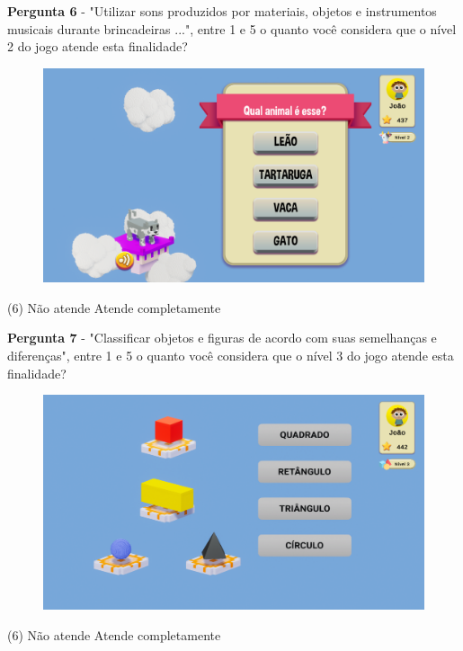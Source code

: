 \documentclass[article,12pt,openany,oneside,a4paper,english,brazil]{abntex2}
\begin{document}
\textbf{Pergunta 6} - "Utilizar sons produzidos por materiais, objetos e instrumentos musicais durante brincadeiras ...", entre 1 e 5 o quanto você considera que o nível 2 do jogo atende esta finalidade?

\begin{figure}[H]
    \centering
    \label{fig:aluno_pergunta_5}
    \includegraphics[width=0.8\linewidth]{GameScreenshots/Level2.png}
\end{figure}

\normalfont
\begin{tasks}[style=enumerate, item-format={\normalfont\tiny}, after-item-skip=4mm](6)
\task Não atende
\task 
\task 
\task 
\task Atende completamente
\end{tasks}

\textbf{Pergunta 7} - "Classificar objetos e figuras de acordo com suas semelhanças e diferenças", entre 1 e 5 o quanto você considera que o nível 3 do jogo atende esta finalidade?

\begin{figure}[H]
    \centering
    \label{fig:aluno_pergunta_5}
    \includegraphics[width=0.8\linewidth]{GameScreenshots/Level3.png}
\end{figure}

\normalfont
\begin{tasks}[style=enumerate, item-format={\normalfont\tiny}, after-item-skip=4mm](6)
\task Não atende
\task 
\task 
\task 
\task Atende completamente
\end{tasks}
\end{document}
